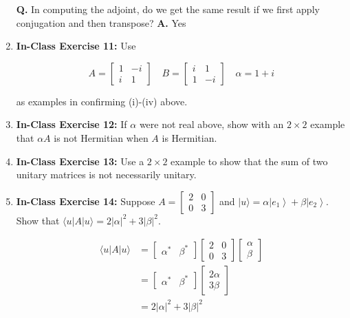 \documentclass[main.tex]{subfiles}
\begin{document}
\begin{enumerate}
    \textbf{Q.} In computing the adjoint, do we get the same result if we first apply conjugation and then transpose? \textbf{A.} Yes
    
\item[] \textbf{In-Class Exercise 11:} Use

    $$A=\left[\begin{array}{cc}1 & -i \\ i & 1\end{array}\right] \quad B=\left[\begin{array}{cc}i & 1 \\ 1 & -i\end{array}\right] \quad \alpha=1+i$$
    
    as examples in confirming (i)-(iv) above.

\item[] \textbf{In-Class Exercise 12:} If $\alpha$ were not real above, show with an $2 \times 2$ example that $\alpha A$ is not Hermitian when $A$ is Hermitian.

\item[] \textbf{In-Class Exercise 13:} Use a $2 \times 2$ example to show that the sum of two unitary matrices is not necessarily unitary.

\item[] \textbf{In-Class Exercise 14:} Suppose $A=\left[\begin{array}{ll}2 & 0 \\ 0 & 3\end{array}\right]$ and $|u\rangle=\alpha\left|e_{1}\right\rangle+\beta\left|e_{2}\right\rangle$. Show that $\langle u|A| u\rangle=2|\alpha|^{2}+3|\beta|^{2}$.

        \begin{align*}
            \langle u|A| u\rangle & = \left[\begin{array}{ll} \alpha^* & \beta^* \end{array}\right]  \left[\begin{array}{ll}2 & 0 \\ 0 & 3\end{array}\right] \left[\begin{array}{l} \alpha \\ \beta \end{array}\right]\\
            & = \left[\begin{array}{ll} \alpha^* & \beta^* \end{array}\right] \left[\begin{array}{l} 2 \alpha \\ 3 \beta \end{array}\right]\\
            &=2|\alpha|^{2}+3|\beta|^{2}
        \end{align*}


\end{enumerate}
\end{document}

